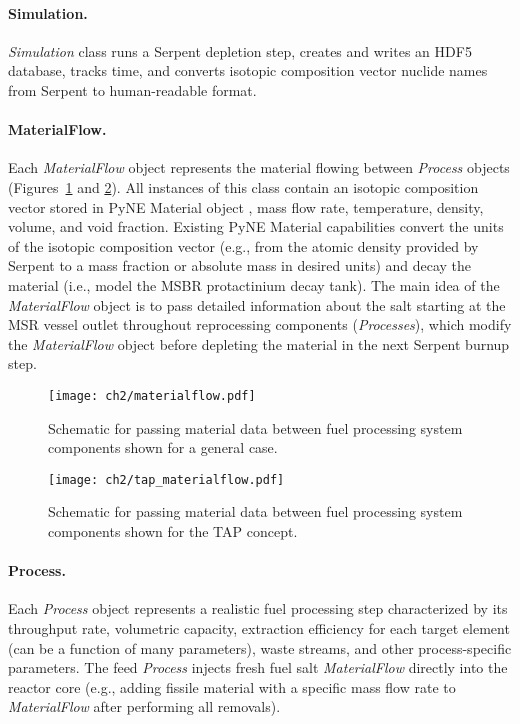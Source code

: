\paragraph*{Simulation.}\textit{Simulation} class runs a Serpent depletion 
step, creates and writes an HDF5 database, tracks time, and converts isotopic 
composition vector nuclide names from Serpent to human-readable format.
\paragraph*{MaterialFlow.}Each \textit{MaterialFlow} object represents the 
material flowing between \textit{Process} objects  
(Figures~\ref{fig:matflow_obj} and \ref{fig:matflow_obj_tap}). All instances 
of this class contain an isotopic composition vector stored in PyNE Material 
object \cite{scopatz_pyne_2012}, mass flow rate, temperature, density, volume, 
and void fraction. 
Existing PyNE Material capabilities convert the units of the isotopic 
composition vector (e.g., from the atomic density provided by Serpent to a 
mass fraction or absolute mass in desired units) and decay the material (i.e., 
model the \gls{MSBR} protactinium decay tank). The main idea of the 
\textit{MaterialFlow} object is to pass detailed information about the salt 
starting at the \gls{MSR} vessel outlet throughout reprocessing components 
(\textit{Processes}), which modify the \textit{MaterialFlow} object before 
depleting the material in the next Serpent burnup step. 
\begin{figure}[ht!] %
	\centering
	\texttt{[image: ch2/materialflow.pdf]}
	\vspace{-0.1in}
	\caption{Schematic for passing material data between fuel processing 
		system components shown for a general case.}
	\label{fig:matflow_obj}
\end{figure}
\begin{figure}[ht!] %
	\centering
	\texttt{[image: ch2/tap\_materialflow.pdf]}
	\vspace{-0.1in}
	\caption{Schematic for passing material data between fuel processing 
		system components shown for the \gls{TAP} concept.}
	\label{fig:matflow_obj_tap}
\end{figure}

\paragraph*{Process.}Each \textit{Process} object represents a 
realistic fuel processing step characterized by its throughput rate, 
volumetric capacity, extraction efficiency for each target element (can be 
a function of many parameters), waste streams, and other process-specific 
parameters. The feed \textit{Process} injects fresh fuel salt 
\textit{MaterialFlow} directly into the reactor core (e.g., adding fissile 
material with a specific mass flow rate to \textit{MaterialFlow} after 
performing all removals).\\


